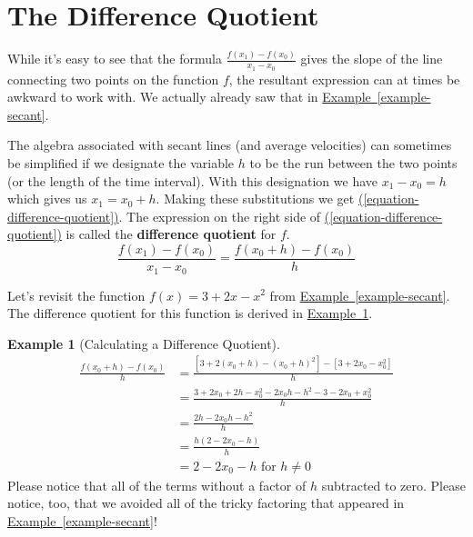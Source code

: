 \documentclass[12pt,]{book}
\newcommand{\terminology}[1]{\textbf{#1}}
\theoremstyle{plain}
\theoremstyle{definition}
\theoremstyle{definition}
\theoremstyle{definition}
\newtheorem{example}[theorem]{Example}
\theoremstyle{definition}
\theoremstyle{definition}
\numberwithin{equation}{section}
\newcommand{\fe}[2]{#1\mathopen{}\left(#2\right)\mathclose{}}
\begin{document}
\par\smallskip\noindent
\typeout{************************************************}
\typeout{************************************************}
\section[{The Difference Quotient}]{The Difference Quotient}\label{section-difference-quotient}
While it's easy to see that the formula \(\frac{\fe{f}{x_1}-\fe{f}{x_0}}{x_1-x_0}\) gives the slope of the line connecting two points on the function \(f\), the resultant expression can at times be awkward to work with. We actually already saw that in \hyperref[example-secant]{Example~\ref{example-secant}}.%
\par
The algebra associated with secant lines (and average velocities) can sometimes be simplified if we designate the variable \(h\) to be the run between the two points (or the length of the time interval). With this designation we have \(x_1-x_0=h\) which gives us \(x_1=x_0+h\). Making these substitutions we get \hyperref[equation-difference-quotient]{(\ref{equation-difference-quotient})}. The expression on the right side of \hyperref[equation-difference-quotient]{(\ref{equation-difference-quotient})} is called the \terminology{difference quotient} for \(f\).\begin{equation}\frac{\fe{f}{x_1}-\fe{f}{x_0}}{x_1-x_0}=\frac{\fe{f}{x_0+h}-\fe{f}{x_0}}{h}\label{equation-difference-quotient}\end{equation}%
\par
Let's revisit the function \(\fe{f}{x}=3+2x-x^2\) from \hyperref[example-secant]{Example~\ref{example-secant}}. The difference quotient for this function is derived in \hyperref[example-difference-quotient]{Example~\ref{example-difference-quotient}}.%
\begin{example}[Calculating a Difference Quotient]\label{example-difference-quotient}
\begin{align*}
\frac{\fe{f}{x_0+h}-\fe{f}{x_0}}{h}&=\frac{\left[3+2\left(x_0+h\right)-\left(x_0+h\right)^2\right]-\left[3+2x_0-x_0^2\right]}{h}\\
&=\frac{3+2x_0+2h-x_0^2-2x_0h-h^2-3-2x_0+x_0^2}{h}\\
&=\frac{2h-2x_0h-h^2}{h}\\
&=\frac{h\left(2-2x_0-h\right)}{h}\\
&=2-2x_0-h\text{ for }h\neq 0
\end{align*}Please notice that all of the terms without a factor of \(h\) subtracted to zero. Please notice, too, that we avoided all of the tricky factoring that appeared in \hyperref[example-secant]{Example~\ref{example-secant}}!%
\end{example}
\end{document}
